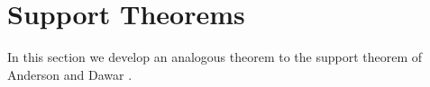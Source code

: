 \documentclass[12pt]{report}
\newtheorem{lem}[thm]{Lemma} \newtheorem{prop}[thm]{Proposition}
\newcommand{\stab}{\text{\textbf{Stab}}}
\newcommand{\sym}{\text{\textbf{Sym}}}
\newcommand{\orb}{\text{\textbf{Orb}}}
\newcommand{\SP}{\text{\textbf{SP}}}
\newcommand{\consp}{\text{sp}}
\newcommand{\row}{\text{row}}
\newcommand{\column}{\text{col}}
\begin{document}


\section{Support Theorems}
In this section we develop an analogous theorem to the support theorem of
Anderson and Dawar \cite{AndersonD17}.
%
\end{document}
